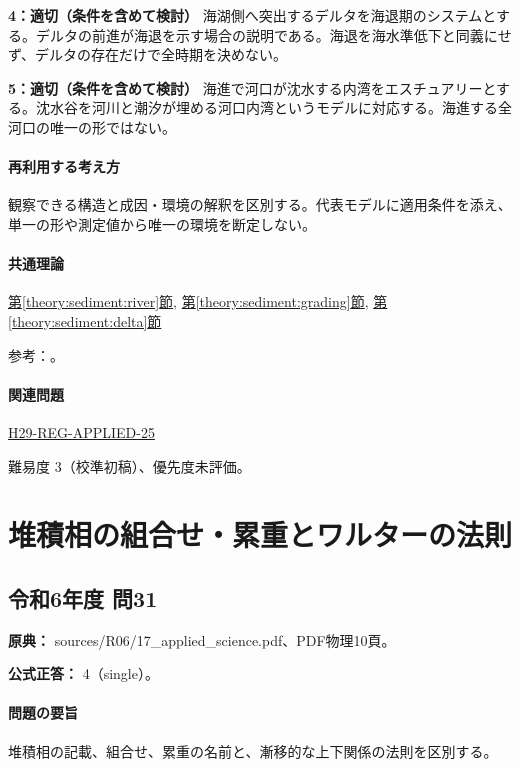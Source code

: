 \noindent\textbf{4：適切（条件を含めて検討）} 海湖側へ突出するデルタを海退期のシステムとする。デルタの前進が海退を示す場合の説明である。海退を海水準低下と同義にせず、デルタの存在だけで全時期を決めない。\par

\noindent\textbf{5：適切（条件を含めて検討）} 海進で河口が沈水する内湾をエスチュアリーとする。沈水谷を河川と潮汐が埋める河口内湾というモデルに対応する。海進する全河口の唯一の形ではない。\par

\paragraph{再利用する考え方} 観察できる構造と成因・環境の解釈を区別する。代表モデルに適用条件を添え、単一の形や測定値から唯一の環境を断定しない。

\paragraph{共通理論} \hyperref[theory:sediment:river]{第\ref*{theory:sediment:river}節}, \hyperref[theory:sediment:grading]{第\ref*{theory:sediment:grading}節}, \hyperref[theory:sediment:delta]{第\ref*{theory:sediment:delta}節}

\par 参考：\cite{sed_mit_environment,sed_walther_oregon}。

\paragraph{関連問題} \hyperref[q:h29-reg-applied-25]{H29-REG-APPLIED-25}

\par 難易度 3（校準初稿）、優先度未評価。

\section{堆積相の組合せ・累重とワルターの法則}

\subsection{令和6年度 問31}
\label{q:r06-reg-applied-31}

\noindent\textbf{原典：} sources/R06/17\_applied\_science.pdf、PDF物理10頁。

\textbf{公式正答：} 4（single）。

\paragraph{問題の要旨} 堆積相の記載、組合せ、累重の名前と、漸移的な上下関係の法則を区別する。

